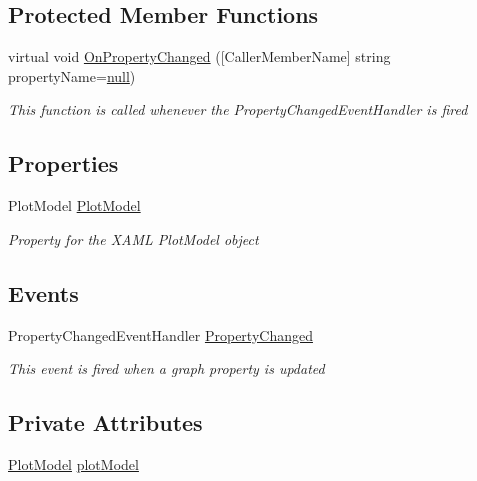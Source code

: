 \subsection*{Protected Member Functions}
\begin{DoxyCompactItemize}
\item 
virtual void \hyperlink{class_c_p_u___o_s___simulator_1_1_controls_1_1_graphs_1_1_view_models_1_1_main_view_model_ae3e82445efa74ccccea66e02d71f0a23}{On\+Property\+Changed} (\mbox{[}Caller\+Member\+Name\mbox{]} string property\+Name=\hyperlink{_old_01_process_01_flags_8cs_afb8e110345c45e74478894341ab6b28e}{null})
\begin{DoxyCompactList}\small\item\em This function is called whenever the Property\+Changed\+Event\+Handler is fired \end{DoxyCompactList}\end{DoxyCompactItemize}
\subsection*{Properties}
\begin{DoxyCompactItemize}
\item 
Plot\+Model \hyperlink{class_c_p_u___o_s___simulator_1_1_controls_1_1_graphs_1_1_view_models_1_1_main_view_model_ab6644e57cd43472c90d2ee96200a8dd0}{Plot\+Model}
\begin{DoxyCompactList}\small\item\em Property for the X\+A\+M\+L Plot\+Model object \end{DoxyCompactList}\end{DoxyCompactItemize}
\subsection*{Events}
\begin{DoxyCompactItemize}
\item 
Property\+Changed\+Event\+Handler \hyperlink{class_c_p_u___o_s___simulator_1_1_controls_1_1_graphs_1_1_view_models_1_1_main_view_model_a29227a0cafda3254e18cb1e3b04b4841}{Property\+Changed}
\begin{DoxyCompactList}\small\item\em This event is fired when a graph property is updated \end{DoxyCompactList}\end{DoxyCompactItemize}
\subsection*{Private Attributes}
\begin{DoxyCompactItemize}
\item 
\hyperlink{class_c_p_u___o_s___simulator_1_1_controls_1_1_graphs_1_1_view_models_1_1_main_view_model_ab6644e57cd43472c90d2ee96200a8dd0}{Plot\+Model} \hyperlink{class_c_p_u___o_s___simulator_1_1_controls_1_1_graphs_1_1_view_models_1_1_main_view_model_a60f5d0ec4f657348fdfbd836bda9249c}{plot\+Model}
\end{DoxyCompactItemize}



